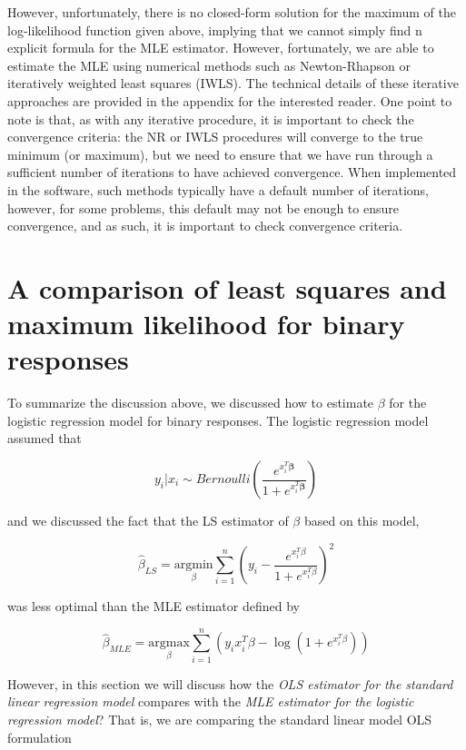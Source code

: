 However, unfortunately, there is no closed-form solution for the maximum of the log-likelihood function given above, implying that we cannot simply find n explicit formula for the MLE estimator. However, fortunately, we are able to estimate the MLE using numerical methods such as Newton-Rhapson or iteratively weighted least squares (IWLS). The technical details of these iterative approaches are provided in the appendix for the interested reader. One point to note is that, as with any iterative procedure, it is important to check the convergence criteria: the NR or IWLS procedures will converge to the true minimum (or maximum), but we need to ensure that we have run through a sufficient number of iterations to have achieved convergence. When implemented in the software, such methods typically have a default number of iterations, however, for some problems, this default may not be enough to ensure convergence, and as such, it is important to check convergence criteria.



\section{A comparison of least squares and maximum likelihood for binary responses}

To summarize the discussion above, we discussed how to estimate $\beta$ for the logistic regression model for binary responses. The logistic regression model assumed that

$$y_i| x_i \sim Bernoulli\left(\frac{e^{x_i^T \boldsymbol{\beta}} }{1 + e^{x_i^T \boldsymbol{\beta}}}\right)$$

and we discussed the fact that the LS estimator of $\beta$ based on this model,

$$\hat{\beta}_{LS} = \underset{\beta}{\text{argmin}} \sum_{i=1}^n \left(y_i -  \frac{e^{x_i^T \beta}}{1 + e^{x_i^T \beta}}\right)^2$$

was less optimal than the MLE estimator defined by

$$\hat{\beta}_{MLE} = \underset{\beta}{\text{argmax}}\sum_{i=1}^n \left( y_i x_i^T \beta - \log \left( 1 + e^{x_i^T \beta} \right) \right) $$



However, in this section we will discuss how the  \textit{OLS estimator for the standard linear regression model} compares with the \textit{MLE estimator for the logistic regression model}? That is, we are comparing the standard linear model OLS formulation

